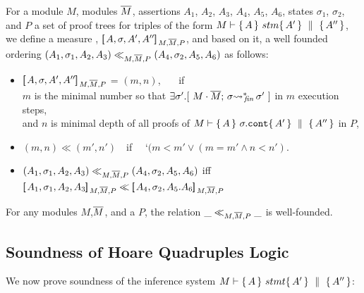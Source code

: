 {
\begin{definition}
For a module $M$, modules $\overline{M}$, assertions $A_1$, $A_2$, $A_3$, $A_4$, $A_5$,  $A_6$, states $\sigma_1$, $\sigma_2$, and   $P$ a set of proof trees for triples of the form 
$M \vdash  \{\, A \, \}\ stm \{\, A' \, \} \, \,\parallel\,\, \{\, A'' \, \} $,  we define a measure
, $[\!\![\, A, \sigma,A',A'' ]\!\!]\,_{M,\overline{M},P} $, and based on it, a well founded ordering $(A_1,\sigma_1,A_2, A_3) \ll_{M,\overline{M},P}  (A_4,\sigma_2,A_5,A_6)$
as follows:
\begin{itemize}
\item
 $[\!\![\, A, \sigma,A',A'' ]\!\!]\,_{M,\overline{M},P} $ = $(m, n)$, \ \ \  if\\
$m$ is the minimal number so that $\exists \sigma'.[\ \leadstoBoundedStarFin {M\cdot \Mtwo} {\sigma}    {\sigma'}\ ]$ in $m$ execution steps, \\
 and $n$ is minimal depth of all proofs of $M \vdash  \{\, A \, \}\ \sigma.\mbox{\normalfont{\texttt{cont}}} \{\, A' \, \} \, \,\parallel\,\, \{\, A'' \, \}  $ in $P$,
 \item
 $(m,n) \ll (m',n')$\ \ if \ \ `$(m<m'\vee  (m=m'  \wedge n < n')$.
\item
$(A_1,\sigma_1,A_2, A_3) \ll_{M,\overline{M},P}  (A_4,\sigma_2,A_5, A_6)$ iff
\\
$\measure {A_1, \sigma_1,A_2, A_3} {M,\Mtwo,P}  \ll \measure {A_4, \sigma_2,A_5. A_6} {M,\Mtwo,P} $
\end{itemize}
\end{definition}
}


\begin{auxLemma}
\label{lemma:normal:two}
For any modules $M$,$\overline{M}$,   and  a %
$P$, the relation $\_ \ll_{M,\overline{M},P}  \_$
is well-founded.
\end{auxLemma}

  

\subsection{ Soundness of  Hoare Quadruples Logic}
\label{sect:prove:sound:quadruples}
We now prove soundness of the inference system $M \vdash   \{\, A \, \}\ stmt \{\, A' \, \} \, \,\parallel\,\, \{\, A'' \, \} $:



